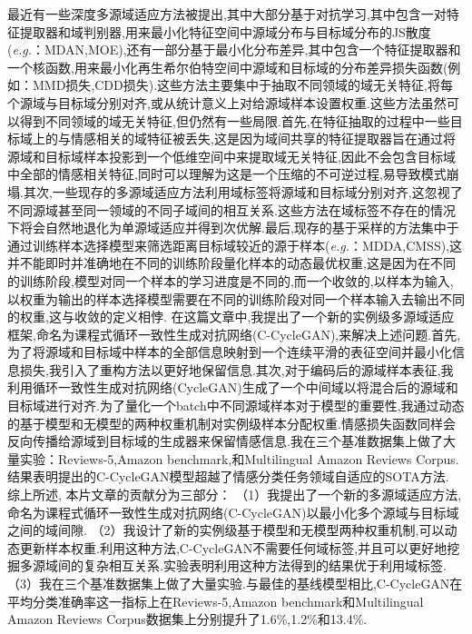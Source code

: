 最近有一些深度多源域适应方法被提出,其中大部分基于对抗学习,其中包含一对特征提取器和域判别器,用来最小化特征空间中源域分布与目标域分布的JS散度(\textit{e.g.}：MDAN\cite{zhao2018adversarial},MOE\cite{guo2018multi}),还有一部分基于最小化分布差异,其中包含一个特征提取器和一个核函数,用来最小化再生希尔伯特空间中源域和目标域的分布差异损失函数(例如：MMD损失\cite{dziugaite2015training},CDD损失\cite{Kang_2019_CVPR}).这些方法主要集中于抽取不同领域的域无关特征,将每个源域与目标域分别对齐,或从统计意义上对给源域样本设置权重.这些方法虽然可以得到不同领域的域无关特征,但仍然有一些局限.首先,在特征抽取的过程中一些目标域上的与情感相关的域特征被丢失,这是因为域间共享的特征提取器旨在通过将源域和目标域样本投影到一个低维空间中来提取域无关特征,因此不会包含目标域中全部的情感相关特征,同时可以理解为这是一个压缩的不可逆过程,易导致模式崩塌\cite{zhu2017unpaired,zhao2019cycleemotiongan,hoffman2018cycada}.其次,一些现存的多源域适应方法利用域标签将源域和目标域分别对齐,这忽视了不同源域甚至同一领域的不同子域间的相互关系.这些方法在域标签不存在的情况下将会自然地退化为单源域适应并得到次优解.最后,现存的基于采样的方法集中于通过训练样本选择模型来筛选距离目标域较近的源于样本(\textit{e.g.}：MDDA\cite{zhao2020distilling},CMSS\cite{yang2020curriculum}),这并不能即时并准确地在不同的训练阶段量化样本的动态最优权重,这是因为在不同的训练阶段,模型对同一个样本的学习进度是不同的,而一个收敛的,以样本为输入,以权重为输出的样本选择模型需要在不同的训练阶段对同一个样本输入去输出不同的权重,这与收敛的定义相悖.
在这篇文章中,我提出了一个新的实例级多源域适应框架,命名为课程式循环一致性生成对抗网络(C-CycleGAN),来解决上述问题.首先,为了将源域和目标域中样本的全部信息映射到一个连续平滑的表征空间并最小化信息损失,我引入了重构方法以更好地保留信息.其次,对于编码后的源域样本表征,我利用循环一致性生成对抗网络(CycleGAN)生成了一个中间域以将混合后的源域和目标域进行对齐.为了量化一个batch中不同源域样本对于模型的重要性,我通过动态的基于模型和无模型的两种权重机制对实例级样本分配权重.情感损失函数同样会反向传播给源域到目标域的生成器来保留情感信息.我在三个基准数据集上做了大量实验：Reviews-5\cite{yu2016learning},Amazon benchmark\cite{chen2012marginalized},和Multilingual Amazon Reviews Corpus\cite{chen2019multi}.结果表明提出的C-CycleGAN模型超越了情感分类任务领域自适应的SOTA方法.
综上所述, 本片文章的贡献分为三部分：
（1）我提出了一个新的多源域适应方法,命名为课程式循环一致性生成对抗网络(C-CycleGAN)以最小化多个源域与目标域之间的域间隙.
（2）我设计了新的实例级基于模型和无模型两种权重机制,可以动态更新样本权重.利用这种方法,C-CycleGAN不需要任何域标签,并且可以更好地挖掘多源域间的复杂相互关系.实验表明利用这种方法得到的结果优于利用域标签.
（3）我在三个基准数据集上做了大量实验.与最佳的基线模型相比,C-CycleGAN在平均分类准确率这一指标上在Reviews-5,Amazon benchmark和Multilingual Amazon Reviews Corpus数据集上分别提升了1.6\%,1.2\%和13.4\%.